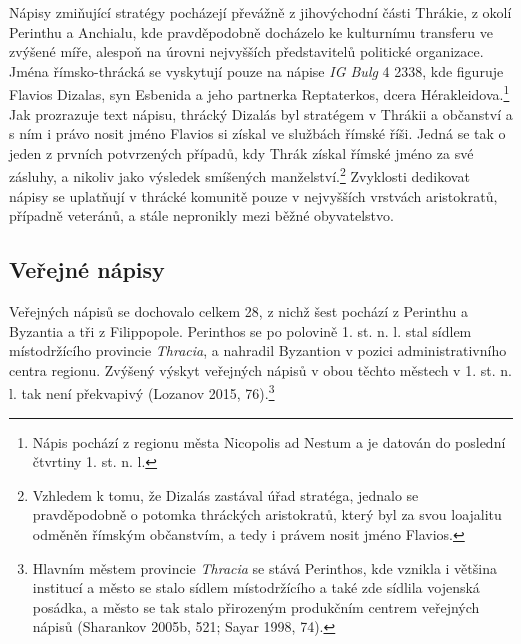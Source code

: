 Nápisy zmiňující stratégy pocházejí převážně z jihovýchodní části Thrákie, z okolí Perinthu a Anchialu, kde pravděpodobně docházelo ke kulturnímu transferu ve zvýšené míře, alespoň na úrovni nejvyšších představitelů politické organizace. Jména římsko-thrácká se vyskytují pouze na nápise {\em IG Bulg} 4 2338, kde figuruje Flavios Dizalas, syn Esbenida a jeho partnerka Reptaterkos, dcera Hérakleidova.\footnote{Nápis pochází z regionu města Nicopolis ad Nestum a je datován do poslední čtvrtiny 1. st. n. l.} Jak prozrazuje text nápisu, thrácký Dizalás byl stratégem v Thrákii a občanství a s ním i právo nosit jméno Flavios si získal ve službách římské říši. Jedná se tak o jeden z prvních potvrzených případů, kdy Thrák získal římské jméno za své zásluhy, a nikoliv jako výsledek smíšených manželství.\footnote{Vzhledem k tomu, že Dizalás zastával úřad stratéga, jednalo se pravděpodobně o potomka thráckých aristokratů, který byl za svou loajalitu odměněn římským občanstvím, a tedy i právem nosit jméno Flavios.} Zvyklosti dedikovat nápisy se uplatňují v thrácké komunitě pouze v nejvyšších vrstvách aristokratů, případně veteránů, a stále nepronikly mezi běžné obyvatelstvo.

\subsection[veřejné-nápisy-11]{Veřejné nápisy}

Veřejných nápisů se dochovalo celkem 28, z nichž šest pochází z Perinthu a Byzantia a tři z Filippopole. Perinthos se po polovině 1. st. n. l. stal sídlem místodržícího provincie {\em Thracia}, a nahradil Byzantion v pozici administrativního centra regionu. Zvýšený výskyt veřejných nápisů v obou těchto městech v 1. st. n. l. tak není překvapivý (Lozanov 2015, 76).\footnote{Hlavním městem provincie {\em Thracia} se stává Perinthos, kde vznikla i většina institucí a město se stalo sídlem místodržícího a také zde sídlila vojenská posádka, a město se tak stalo přirozeným produkčním centrem veřejných nápisů (Sharankov 2005b, 521; Sayar 1998, 74).}

